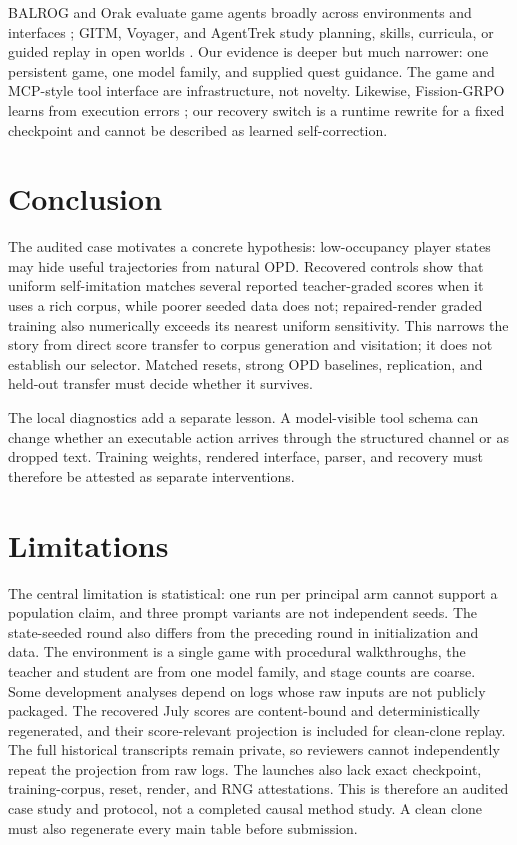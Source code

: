 \documentclass[11pt,a4paper]{article}
\begin{document}
BALROG and Orak evaluate game agents broadly across environments and interfaces
\citep{paglieri2025balrog,park2025orak}; GITM, Voyager, and AgentTrek study
planning, skills, curricula, or guided replay in open worlds
\citep{zhu2023gitm,wang2023voyager,zheng2025agenttrek}. Our evidence is deeper
but much narrower: one persistent game, one model family, and supplied quest
guidance. The game and MCP-style tool interface are infrastructure, not novelty.
Likewise, Fission-GRPO learns from execution errors
\citep{zhang2026fission}; our recovery switch is a runtime rewrite for a fixed
checkpoint and cannot be described as learned self-correction.

\section{Conclusion}

The audited case motivates a concrete hypothesis: low-occupancy player states
may hide useful trajectories from natural OPD. Recovered controls show that
uniform self-imitation matches several reported teacher-graded scores when it
uses a rich corpus, while poorer seeded data does not; repaired-render graded
training also numerically exceeds its nearest uniform sensitivity. This narrows
the story from direct score transfer to corpus generation and visitation; it
does not establish our selector. Matched resets, strong
OPD baselines, replication, and held-out transfer must decide whether it
survives.

The local diagnostics add a separate lesson. A model-visible tool schema can
change whether an executable action arrives through the structured channel or
as dropped text. Training weights, rendered interface, parser, and recovery
must therefore be attested as separate interventions.

\label{acl:main-content-end}
\section*{Limitations}

The central limitation is statistical: one run per principal arm cannot support
a population claim, and three prompt variants are not independent seeds. The
state-seeded round also differs from the preceding round in initialization and
data. The environment is a single game with procedural walkthroughs, the
teacher and student are from one model family, and stage counts are coarse. Some
development analyses depend on logs whose raw inputs are not publicly packaged.
The recovered July scores are content-bound and deterministically regenerated,
and their score-relevant projection is included for clean-clone replay. The
full historical transcripts remain private, so reviewers cannot independently
repeat the projection from raw logs. The launches also lack exact checkpoint,
training-corpus, reset, render, and RNG
attestations. This is therefore an audited case study and protocol, not a
completed causal method study. A clean clone must also regenerate every main
table before submission.
\end{document}
